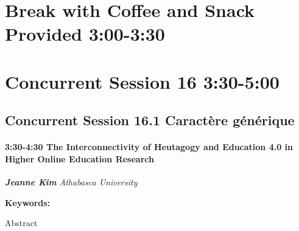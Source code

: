 \documentclass[
]{book}
\begin{document}
\hypertarget{break-with-coffee-and-snack-provided-300-330-2}{%
\section*{Break with Coffee and Snack Provided \textbar{} 3:00-3:30}\label{break-with-coffee-and-snack-provided-300-330-2}}

\hypertarget{concurrent-session-16-330-500}{%
\section*{Concurrent Session 16 \textbar{} 3:30-5:00}\label{concurrent-session-16-330-500}}

\hypertarget{concurrent-session-16.1-wildcard}{%
\subsection*{Concurrent Session 16.1 \textbar{} Caractère générique}\label{concurrent-session-16.1-wildcard}}

\begin{session}
\hypertarget{the-interconnectivity-of-heutagogy-and-education-4.0-in-higher-online-education-research}{%
\paragraph*{\texorpdfstring{3:30-4:30 \textbar{} \textbf{The
Interconnectivity of Heutagogy and Education 4.0 in Higher Online
Education} \textbar{}
Research}{3:30-4:30 \textbar{} The Interconnectivity of Heutagogy and Education 4.0 in Higher Online Education \textbar{} Research}}\label{the-interconnectivity-of-heutagogy-and-education-4.0-in-higher-online-education-research}}

\textbf{\emph{Jeanne Kim}} \textbar{} \emph{Athabasca University}

\textbf{Keywords:}

Abstract
\end{session}
\end{document}
